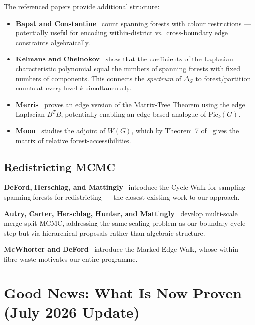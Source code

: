 \documentclass[11pt]{article}
\begin{document}
The referenced papers provide additional structure:
\begin{itemize}
  \item \textbf{Bapat and Constantine}~\cite{bapat1992enumerating} count
    spanning forests with colour restrictions --- potentially useful for
    encoding within-district vs.\ cross-boundary edge constraints algebraically.
  \item \textbf{Kelmans and Chelnokov}~\cite{kelmans1974polynomial} show that
    the coefficients of the Laplacian characteristic polynomial equal the
    numbers of spanning forests with fixed numbers of components. This connects
    the \emph{spectrum} of $\Delta_G$ to forest/partition counts at every level
    $k$ simultaneously.
  \item \textbf{Merris}~\cite{merris1989edge} proves an edge version of the
    Matrix-Tree Theorem using the edge Laplacian $B^T B$, potentially enabling
    an edge-based analogue of $\mathrm{Pic}_k(G)$.
  \item \textbf{Moon}~\cite{moon1995adjoint} studies the adjoint of $W(G)$,
    which by Theorem~7 of~\cite{chebotarev2006forest} gives the matrix of
    relative forest-accessibilities.
\end{itemize}

\subsection{Redistricting MCMC}

\textbf{DeFord, Herschlag, and Mattingly}~\cite{deford2025cycle} introduce
the Cycle Walk for sampling spanning forests for redistricting --- the closest
existing work to our approach.

\textbf{Autry, Carter, Herschlag, Hunter, and
Mattingly}~\cite{autry2020multiscale} develop multi-scale merge-split MCMC,
addressing the same scaling problem as our boundary cycle step but via
hierarchical proposals rather than algebraic structure.

\textbf{McWhorter and DeFord}~\cite{mew} introduce the Marked Edge Walk, whose
within-fibre waste motivates our entire programme.


\section{Good News: What Is Now Proven (July 2026 Update)}
\end{document}
